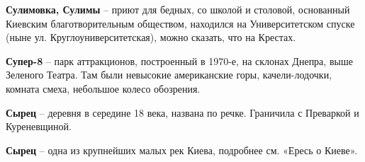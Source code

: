 \textbf{Сулимовка, Сулимы} – приют для бедных, со школой и столовой, основанный Киевским благотворительным обществом, находился на Университетском спуске (ныне ул. Круглоуниверситетская), можно сказать, что на Крестах.\\

\medskip

\textbf{Супер-8} – парк аттракционов, построенный в 1970-е, на склонах Днепра, выше Зеленого Театра. Там были невысокие американские горы, качели-лодочки, комната смеха, небольшое колесо обозрения.\\

\medskip

\textbf{Сырец} – деревня в середине 18 века, названа по речке. Граничила с Преваркой и Куреневщиной.\\

\medskip

\textbf{Сырец} – одна из крупнейших малых рек Киева, подробнее см. «Ересь о Киеве».